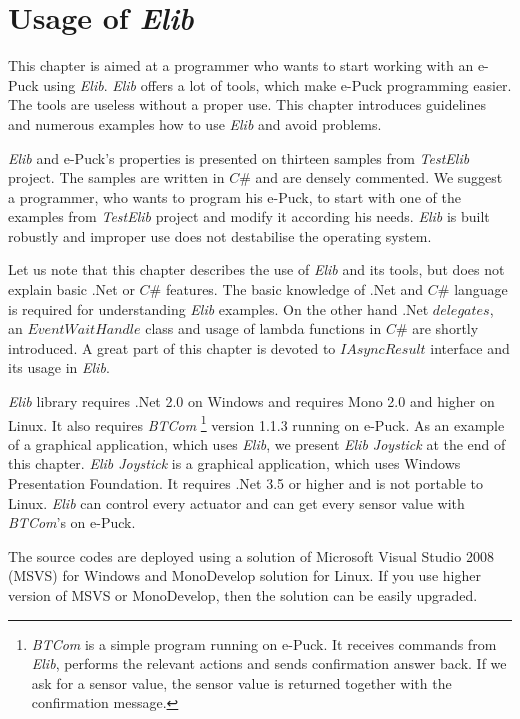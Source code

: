 \chapter{Usage of {\it Elib}} \label{chap:usage}
  This chapter is aimed at a programmer who wants to start working with an e-Puck using {\it Elib}. 
  {\it Elib} offers a lot of tools, which make e-Puck programming easier. 
  The tools are useless without a proper use. This chapter introduces guidelines and numerous
  examples how to use {\it Elib} and avoid problems.

  {\it Elib} and e-Puck's properties is presented on thirteen samples from {\it TestElib} project.
  The samples are written in $C\#$ and are densely commented.
  We suggest a programmer, who wants to program his e-Puck, to start with one of the examples
  from {\it TestElib} project and modify it according his needs.
  {\it Elib} is built robustly and improper use does not destabilise the operating system.

  Let us note that this chapter describes the use of {\it Elib} and its tools,
  but does not explain basic .Net or $C\#$ features. The basic knowledge of .Net and $C\#$ language is required
  for understanding {\it Elib} examples. On the other hand .Net $delegates$, an $EventWaitHandle$ class and usage of lambda functions in $C\#$
  are shortly introduced. A great part of this chapter is devoted to $IAsyncResult$ interface and its
  usage in {\it Elib}.

  {\it Elib} library requires .Net 2.0 on Windows and requires Mono 2.0 %
  and higher on Linux. It also requires {\it BTCom} 
  \footnote{ {\it BTCom} is a simple program running on e-Puck. 
  It receives commands from {\it Elib}, performs the relevant actions
  and sends confirmation answer back. If we ask for a sensor value, the sensor value is returned
  together with the confirmation message.
  }
  version 1.1.3 running on e-Puck.  
  As an example of a graphical application, which uses {\it Elib}, 
  we present {\it Elib Joystick} at the end of this chapter.
  {\it Elib Joystick} is a graphical application, which uses Windows Presentation Foundation. It requires .Net 3.5 or higher
  and is not portable to Linux.
  {\it Elib} can control every actuator and can get every sensor 
  value with {\it BTCom}'s  on e-Puck. 

  The source codes are deployed using a solution of Microsoft Visual Studio 2008 (MSVS) for Windows 
  and MonoDevelop solution for Linux.
  If you use higher version of MSVS or MonoDevelop, then the solution can be easily upgraded.	

